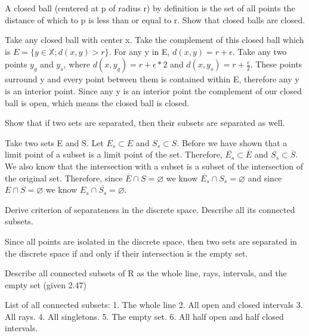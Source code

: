 \documentclass[12pt]{article}
\newenvironment{exercise}[2][Exercise]{\begin{trivlist}
\item[\hskip \labelsep {\bfseries #1}\hskip \labelsep {\bfseries #2.}]}{\end{trivlist}}
\begin{document}
\begin{exercise}{1.4}
A closed ball (centered at p of radius r) by definition is the set of all points the distance of which to p is less than or equal to r. Show that closed balls are closed. 
\end{exercise}
Take any closed ball with center x. Take the complement of this closed ball which is $E = \{y \in \mathbb{X}; d(x,y) > r\}$. For any y in E, $d(x,y) = r + \epsilon$. Take any two points $y_g$ and $y_s$, where $d(x,y_g) = r + \epsilon*2$ and $d(x,y_s) = r + \frac{\epsilon}{2}$. These points surround y and every point between them is contained within E, therefore any y is an interior point. Since any y is an interior point the complement of our closed ball is open, which means the closed ball is closed. 

\begin{exercise}{2.1}                                                                                      Show that if two sets are separated, then their subsets are separated as well.                             \end{exercise}
Take two sets E and S. Let $E_s \subset E$ and $S_s \subset S$. Before we have shown that a limit point of a subset is a limit point of the set. Therefore, $\overline{E_s} \subset \overline{E}$ and $\overline{S_s} \subset \overline{S}$. We also know that the intersection with a subset is a subset of the intersection of the original set. Therefore, since $\overline{E} \cap S = \varnothing$ we know $\overline{E_s} \cap S_s = \varnothing$ and since $E \cap \overline{S} = \varnothing$ we know $E_s \cap \overline{S_s} = \varnothing$.

\begin{exercise}{2.2}                                                                                      Derive criterion of separateness in the discrete space. Describe all its connected subsets.                \end{exercise}
Since all points are isolated in the discrete space, then two sets are separated in the discrete space if and only if their intersection is the empty set.

\begin{exercise}{2.3}                                                                                      Describe all connected subsets of R as the whole line, rays, intervals, and the empty set (given 2.47)     \end{exercise}

List of all connected subsets: 1. The whole line 2. All open and closed intervals 3. All rays. 4. All singletons. 5. The empty set. 6. All half open and half closed intervals.
\end{document}
